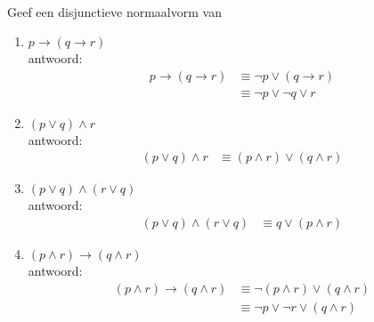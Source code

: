 \begin{answer}\mbox{}\\ %
Geef een disjunctieve normaalvorm van
\begin{enumerate}[label=\textit{\alph*.}]
\item $p\rightarrow(q\rightarrow r)$\\
antwoord:
\begin{align}
    p\rightarrow(q\rightarrow r) &\equiv \neg p\vee(q\rightarrow r) \tag{(St-2.3.2: 7)}\\
    &\equiv \neg p\vee\neg q\vee r \tag{(St-2.3.2: 7)}
\end{align}
\item $(p\lor q)\land r$\\
antwoord: 
\begin{align}
    (p\vee q)\wedge r &\equiv (p\wedge r)\vee (q\wedge r) \tag{St-2.3.2:11)}
\end{align}
\item $(p\lor q)\land(r\lor q)$\\
antwoord:
\begin{align}
    (p\vee q)\wedge (r\vee q) &\equiv q\vee(p\wedge r) \tag{St-2.3.2:12)}
\end{align}
\item $(p\land r)\rightarrow(q\land r)$\\
antwoord:
\begin{align}
    (p\wedge r)\rightarrow(q\wedge r) &\equiv \neg(p\wedge r)\vee(q\wedge r) \tag{St-2.3.2: 7)}\\
    &\equiv \neg p\vee\neg r\vee(q\wedge r)\tag{St-2.3.2:10}
\end{align}
\end{enumerate}
\end{answer}

